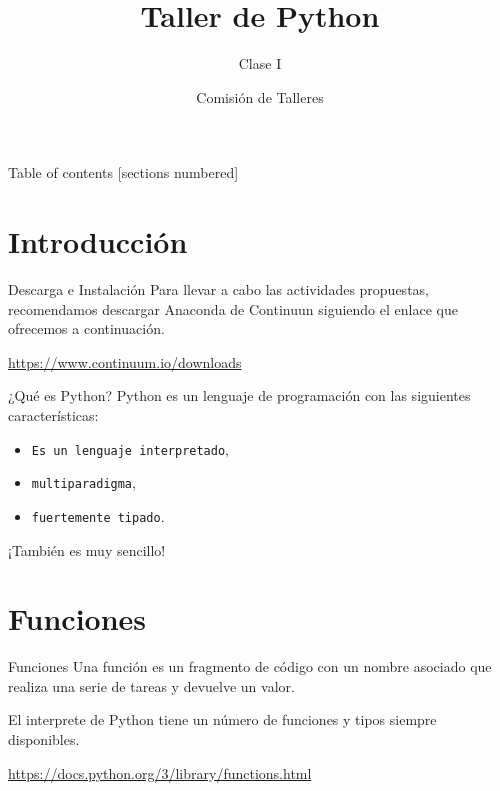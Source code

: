\documentclass[10pt]{beamer}
\title{Taller de Python}
\subtitle{Clase I}
\date{}
\author{Comisión de Talleres}
\institute{Centro de Estudiantes Tecnológicos}
\begin{document}
\maketitle

\begin{frame}{Table of contents}
  [sections numbered]
  \tableofcontents[hideallsubsections]
\end{frame}

\section{Introducción}
\begin{frame}[fragile]{Descarga e Instalación}
Para llevar a cabo las actividades propuestas, recomendamos descargar \alert{Anaconda} de Continuun siguiendo el enlace que ofrecemos a continuación.
\vspace{1em}
\begin{center}
	\url{https://www.continuum.io/downloads}
\end{center}
\end{frame}

\begin{frame}[fragile]{¿Qué es Python?}
Python es un \alert{lenguaje de programación} con las siguientes características:

\begin{itemize}
	\item \texttt{Es un lenguaje interpretado},
	\item \texttt{multiparadigma},
	\item \texttt{fuertemente tipado}.
\end{itemize}

\begin{center}
	¡También es muy sencillo!
\end{center}
\end{frame}

\section{Funciones}
\begin{frame}[fragile]{Funciones}
\alert{Una función es un fragmento de código con un nombre asociado que realiza una serie de tareas y devuelve un valor.}

\vspace{1em}

El interprete de Python tiene un número de funciones y tipos siempre disponibles. 
	
\begin{center}
\url{https://docs.python.org/3/library/functions.html}
\end{center}
\end{frame}
\end{document}
